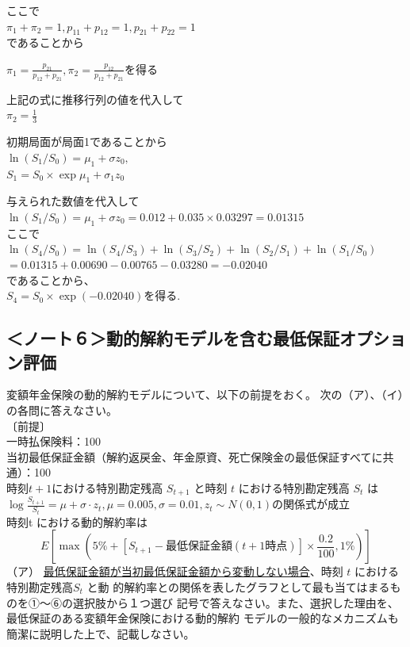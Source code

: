 \documentclass[report,gutter=10mm,fore-edge=10mm,uplatex,dvipdfmx]{jlreq}
\begin{document}
ここで\\
$\pi_1+\pi_2=1, p_{11}+p_{12}=1, p_{21}+p_{22}=1$\\
であることから

$\pi_1=\frac{p_{21}}{p_{12}+p_{21}}, \pi_2=\frac{p_{12}}{p_{12}+p_{21}}$を得る

上記の式に推移行列の値を代入して\\
$\pi_2=\frac{1}{3}$

初期局面が局面1であることから\\
$\ln(S_1/S_0)=\mu_1+\sigma z_0,$\\
$S_1=S_0\times\exp{\mu_1+\sigma_1 z_0}$

与えられた数値を代入して
$\ln(S_1/S_0)=\mu_1+\sigma z_0=0.012+0.035\times 0.03297=0.01315$\\

ここで
$\ln(S_4/S_0)=\ln(S_4/S_3)+\ln(S_3/S_2)+\ln(S_2/S_1)+\ln(S_1/S_0)$\\
$=0.01315+0.00690-0.00765-0.03280=-0.02040$\\
であることから、\\
$S_4=S_0\times\exp(-0.02040)$を得る.

\subsection{＜ノート６＞動的解約モデルを含む最低保証オプション評価}
変額年金保険の動的解約モデルについて、以下の前提をおく。
次の（ア）、（イ）の各問に答えなさい。\\
〔前提〕\\
一時払保険料：100\\
当初最低保証金額（解約返戻金、年金原資、死亡保険金の最低保証すべてに共通）：100\\
時刻$t +1$における特別勘定残高 $S_{t+1}$ と時刻 $t$ における特別勘定残高 $S_t$ は\\
$\log{\frac{S_{t+1}}{S_t}}=\mu+\sigma\cdot z_t, \mu=0.005, \sigma=0.01, z_t\sim N(0,1)$の関係式が成立\\
時刻t における動的解約率は
$$
E\left[\max{\left(5\%+\left[S_{t+1}-\text{最低保証金額}(t+1時点)\right]\times\frac{0.2}{100},1\%\right)}\right]
$$
（ア） \underline{最低保証金額が当初最低保証金額から変動しない場合}、時刻 $t$ における特別勘定残高$S_t$ と動
的解約率との関係を表したグラフとして最も当てはまるものを①～⑥の選択肢から１つ選び
記号で答えなさい。また、選択した理由を、最低保証のある変額年金保険における動的解約
モデルの一般的なメカニズムも簡潔に説明した上で、記載しなさい。
\end{document}
